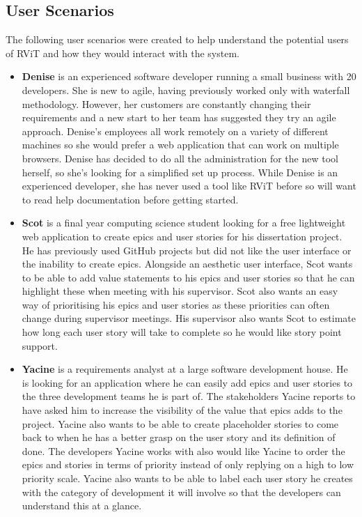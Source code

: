 \documentclass[l4proj.tex]{subfiles}
\begin{document}
\subsection{User Scenarios}
The following user scenarios were created to help understand the potential users of RViT and how they would interact with the system.
\begin{itemize}
    \item \textbf{Denise} is an experienced software developer running a small business with 20 developers. She is new to agile, having previously worked only with waterfall methodology. However, her customers are constantly changing their requirements and a new start to her team has suggested they try an agile approach. Denise's employees all work remotely on a variety of different machines so she would prefer a web application that can work on multiple browsers. Denise has decided to do all the administration for the new tool herself, so she's looking for a simplified set up process. While Denise is an experienced developer, she has never used a tool like RViT before so will want to read help documentation before getting started.\\
    
    \item  \textbf{Scot} is a final year computing science student looking for a free lightweight web application to create epics and user stories for his dissertation project. He has previously used GitHub projects but did not like the user interface or the inability to create epics. Alongside an aesthetic user interface, Scot wants to be able to add value statements to his epics and user stories so that he can highlight these when meeting with his supervisor. Scot also wants an easy way of prioritising his epics and user stories as these priorities can often change during supervisor meetings. His supervisor also wants Scot to estimate how long each user story will take to complete so he would like story point support.\\

    \item \textbf{Yacine} is a requirements analyst at a large software development house. He is looking for an application where he can easily add epics and user stories to the three development teams he is part of. The stakeholders Yacine reports to have asked him to increase the visibility of the value that epics adds to the project. Yacine also wants to be able to create placeholder stories to come back to when he has a better grasp on the user story and its definition of done. The developers Yacine works with also would like Yacine to order the epics and stories in terms of priority instead of only replying on a high to low priority scale. Yacine also wants to be able to label each user story he creates with the category of development it will involve so that the developers can understand this at a glance. \\


\end{itemize}
\end{document}
